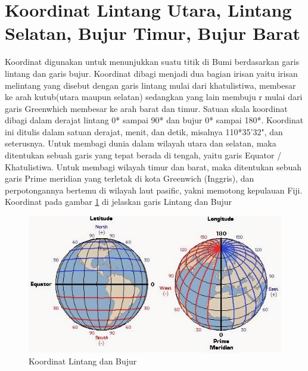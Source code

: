 

\section{Koordinat Lintang Utara, Lintang Selatan, Bujur Timur, Bujur Barat}
Koordinat digunakan untuk menunjukkan suatu titik di Bumi berdasarkan garis lintang dan garis bujur. Koordinat dibagi menjadi dua bagian irisan yaitu irisan melintang yang disebut dengan garis lintang mulai dari khatulistiwa, membesar ke arah kutub(utara maupun selatan) sedangkan yang lain membuju r mulai dari garis Greenwhich membesar ke arah barat dan timur. Satuan skala koordinat dibagi dalam derajat lintang 0* sampai 90* dan bujur 0* sampai 180*. Koordinat ini ditulis dalam satuan derajat, menit, dan detik, misalnya 110*35'32", dan seterusnya. Untuk membagi dunia dalam wilayah utara dan selatan, maka ditentukan sebuah garis yang tepat berada di tengah, yaitu garis Equator / Khatulistiwa. Untuk membagi wilayah timur dan barat, maka ditentukan sebuah garis Prime meridian yang terletak di kota Greenwich (Inggris), dan perpotongannya bertemu di wilayah laut pasific, yakni memotong kepulauan Fiji.
Koordinat pada gambar \ref{Koordinat} di jelaskan garis Lintang dan Bujur
\begin{figure}[ht]
	\centerline{\includegraphics[width=1\textwidth]{figures/Koordinat.JPG}}
	\caption{Koordinat Lintang dan Bujur}
	\label{Koordinat}
	\end{figure}

